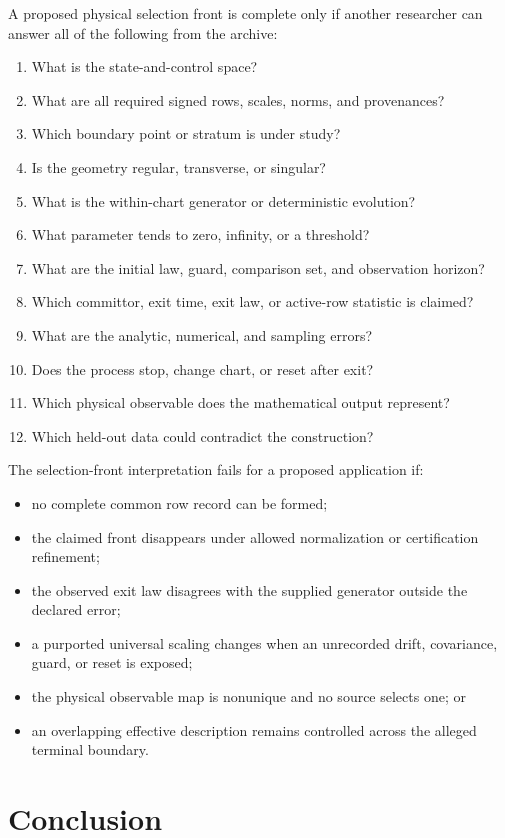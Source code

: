 \documentclass[11pt]{article}
\theoremstyle{definition}
\theoremstyle{remark}
\begin{document}
A proposed physical selection front is complete only if another researcher
can answer all of the following from the archive:
\begin{enumerate}[leftmargin=2em]
\item What is the state-and-control space?
\item What are all required signed rows, scales, norms, and provenances?
\item Which boundary point or stratum is under study?
\item Is the geometry regular, transverse, or singular?
\item What is the within-chart generator or deterministic evolution?
\item What parameter tends to zero, infinity, or a threshold?
\item What are the initial law, guard, comparison set, and observation
      horizon?
\item Which committor, exit time, exit law, or active-row statistic is
      claimed?
\item What are the analytic, numerical, and sampling errors?
\item Does the process stop, change chart, or reset after exit?
\item Which physical observable does the mathematical output represent?
\item Which held-out data could contradict the construction?
\end{enumerate}

The selection-front interpretation fails for a proposed application if:
\begin{itemize}
\item no complete common row record can be formed;
\item the claimed front disappears under allowed normalization or
      certification refinement;
\item the observed exit law disagrees with the supplied generator outside
      the declared error;
\item a purported universal scaling changes when an unrecorded drift,
      covariance, guard, or reset is exposed;
\item the physical observable map is nonunique and no source selects one;
      or
\item an overlapping effective description remains controlled across the
      alleged terminal boundary.
\end{itemize}

\section{Conclusion}
\label{sec:conclusion}
\end{document}

